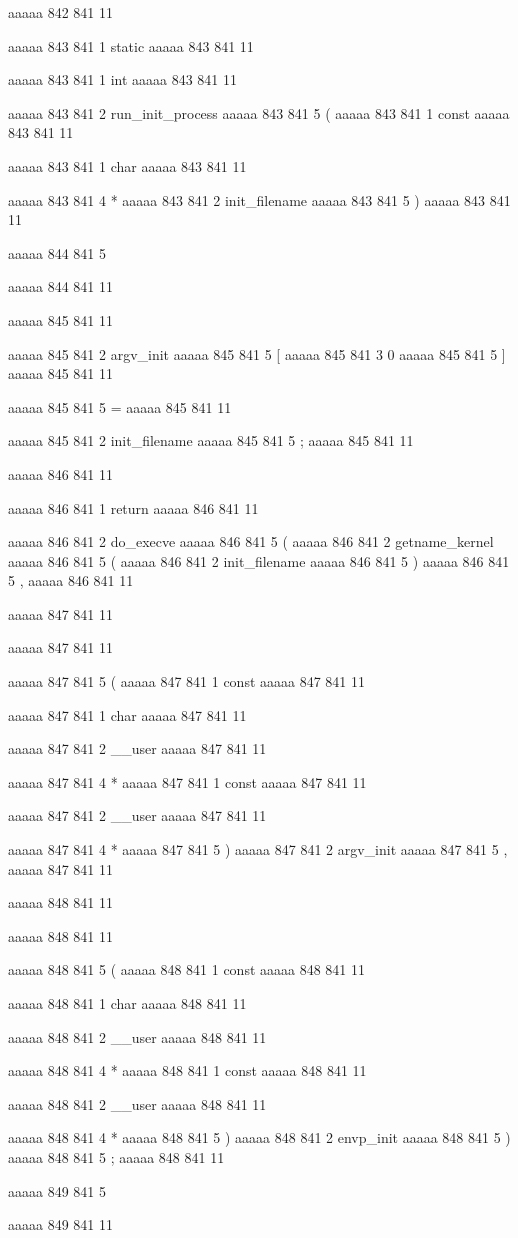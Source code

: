 aaaaa 842 841
11


aaaaa 843 841
1
static
aaaaa 843 841
11
 
aaaaa 843 841
1
int
aaaaa 843 841
11
 
aaaaa 843 841
2
run_init_process
aaaaa 843 841
5
(
aaaaa 843 841
1
const
aaaaa 843 841
11
 
aaaaa 843 841
1
char
aaaaa 843 841
11
 
aaaaa 843 841
4
*
aaaaa 843 841
2
init_filename
aaaaa 843 841
5
)
aaaaa 843 841
11


aaaaa 844 841
5
{
aaaaa 844 841
11


aaaaa 845 841
11
	
aaaaa 845 841
2
argv_init
aaaaa 845 841
5
[
aaaaa 845 841
3
0
aaaaa 845 841
5
]
aaaaa 845 841
11
 
aaaaa 845 841
5
=
aaaaa 845 841
11
 
aaaaa 845 841
2
init_filename
aaaaa 845 841
5
;
aaaaa 845 841
11


aaaaa 846 841
11
	
aaaaa 846 841
1
return
aaaaa 846 841
11
 
aaaaa 846 841
2
do_execve
aaaaa 846 841
5
(
aaaaa 846 841
2
getname_kernel
aaaaa 846 841
5
(
aaaaa 846 841
2
init_filename
aaaaa 846 841
5
)
aaaaa 846 841
5
,
aaaaa 846 841
11


aaaaa 847 841
11
	
aaaaa 847 841
11
	
aaaaa 847 841
5
(
aaaaa 847 841
1
const
aaaaa 847 841
11
 
aaaaa 847 841
1
char
aaaaa 847 841
11
 
aaaaa 847 841
2
__user
aaaaa 847 841
11
 
aaaaa 847 841
4
*
aaaaa 847 841
1
const
aaaaa 847 841
11
 
aaaaa 847 841
2
__user
aaaaa 847 841
11
 
aaaaa 847 841
4
*
aaaaa 847 841
5
)
aaaaa 847 841
2
argv_init
aaaaa 847 841
5
,
aaaaa 847 841
11


aaaaa 848 841
11
	
aaaaa 848 841
11
	
aaaaa 848 841
5
(
aaaaa 848 841
1
const
aaaaa 848 841
11
 
aaaaa 848 841
1
char
aaaaa 848 841
11
 
aaaaa 848 841
2
__user
aaaaa 848 841
11
 
aaaaa 848 841
4
*
aaaaa 848 841
1
const
aaaaa 848 841
11
 
aaaaa 848 841
2
__user
aaaaa 848 841
11
 
aaaaa 848 841
4
*
aaaaa 848 841
5
)
aaaaa 848 841
2
envp_init
aaaaa 848 841
5
)
aaaaa 848 841
5
;
aaaaa 848 841
11


aaaaa 849 841
5
}
aaaaa 849 841
11


